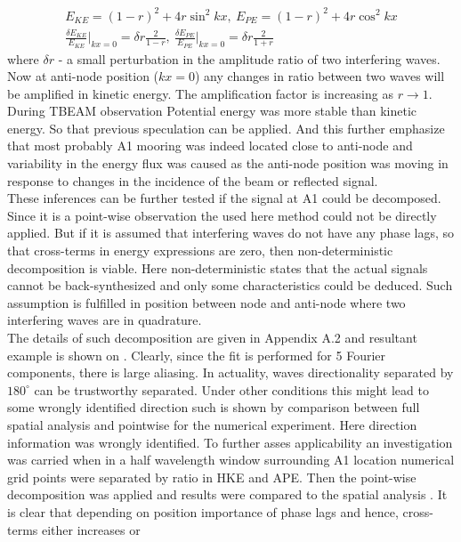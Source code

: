 \documentclass[12pt]{article}
\begin{document}
\begin{align}
	E_{KE} = (1 - r)^2 + 4r \sin^2{k x},~E_{PE} = (1 - r)^2 + 4r \cos^2{k x}\\
	\frac{\delta E_{KE}}{E_{KE}}\big|_{kx = 0} = \delta r \frac{2}{1 - r},~\frac{\delta 
	E_{PE}}{E_{PE}}\big|_{kx = 0} = \delta r \frac{2}{1 + r}
\end{align}
where $\delta r$ - a small perturbation in the amplitude ratio of two interfering waves. Now at 
anti-node position ($kx = 0$) any changes in ratio between two waves will be amplified in 
kinetic energy. The amplification factor is increasing as $r \rightarrow 1$.\\
During TBEAM observation Potential energy was more stable than kinetic energy. So that previous 
speculation can be applied. And this further emphasize that most probably A1 mooring was indeed 
located close to anti-node and variability in the energy flux was caused as the anti-node position 
was moving in response to changes in the incidence of the beam or reflected signal.\\
These inferences can be further tested if the signal at A1 could be decomposed. Since it is a 
point-wise observation the used here method could not be directly applied. But if it is assumed 
that interfering waves do not have any phase lags, so that cross-terms in energy expressions are 
zero, then non-deterministic decomposition is viable. Here non-deterministic states that the 
actual signals cannot be back-synthesized and only some characteristics could be deduced. Such 
assumption is fulfilled in position between node and anti-node where two interfering waves are in 
quadrature.\\
The details of such decomposition are given in Appendix A.2 and resultant example is shown on 
. Clearly, since the fit is performed for 5 Fourier components, there is 
large aliasing. In actuality, waves directionality separated by $180^{\circ}$ can be 
trustworthy separated. Under other conditions this might lead to some wrongly identified direction 
such is shown by comparison between full spatial analysis and pointwise for the numerical 
experiment. Here direction information was wrongly identified. To further asses applicability an 
investigation was carried when in a half wavelength window surrounding A1 location numerical grid 
points were separated by ratio in HKE and APE. Then the point-wise decomposition was applied and 
results were compared to the spatial analysis . It is clear that 
depending on position importance of phase lags and hence, cross-terms either increases or 
\end{document}
